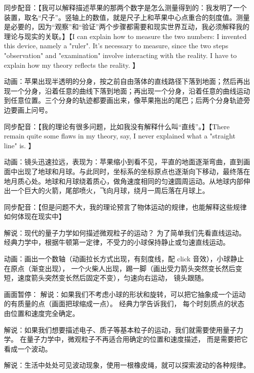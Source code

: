 同步配音：【我可以解释描述苹果的那两个数字是怎么测量得到的：我发明了一个装置，取名“尺子”。竖轴上的数值，就是尺子上和苹果中心点重合的刻度值。测量是必要的，因为“观察”和“验证”两个步骤都需要和现实世界互动，我必须解释我的理论与现实的关联。】【I can explain how to measure the two numbers: I invented this device, namely a "ruler". It's necessary to measure, since the two steps "observation" and "examination" involve interacting with the reality. I have to explain how my theory reflects the reality. 】



动画：苹果出现半透明的分身，按之前自由落体的直线路径下落到地面；然后再出现一个分身，沿着任意的曲线下落到地面；再出现一个分身，沿着任意的曲线运动到任意位置。三个分身的轨迹都要画出来，像苹果拖出的尾巴；后两个分身轨迹旁边要画上问号。


同步配音：【我的理论有很多问题，比如我没有解释什么叫“直线”。】【There remain quite some flaws in my theory, say, I never explained what a "straight line" is. 】



动画：镜头迅速拉远，表现为：苹果缩小到看不见，平直的地面逐渐弯曲，直到画面中出现了地球和月球。与此同时，坐标系的坐标原点也逐渐向下移动，最终落在地月质心处。地球和月球绕着质心，做角速度相同的匀速圆周运动。从地球内部伸出一个巨大的火箭，尾部喷火，飞向月球，绕月一周后落在月球上。


同步配音：【但是问题不大，我的理论预言了物体运动的规律，也能解释这些规律如何体现在现实中】





解说：现代的量子力学如何描述微观粒子的运动？ 为了简单我们先看直线运动。 经典力学中，根据牛顿第一定律，不受力的小球保持静止或匀速直线运动。

动画：画出一个数轴（动画拉长方式出现，有刻度线，配 click 音效），小球静止在原点（渐变出现）， 一个火柴人出现，踢一脚（画出受力箭头突然变长然后变短，速度箭头突然变长然后固定不变），匀速向右运动， 镜头跟随。

画面暂停： 解说：如果我们不考虑小球的形状和旋转，可以把它抽象成一个运动的有质量的点（画面把球缩成一点）。 经典力学告诉我们， 每个时刻质点的状态由位置和速度完全确定。

解说：如果我们想要描述电子、质子等基本粒子的运动，我们就需要使用量子力学。 在量子力学中，微观粒子不再适合用确定的位置和速度描述， 而是需要把它看成一个波动。

解说：生活中处处可见波动现象，使用一根橡皮绳，就可以探索波动的各种规律。

